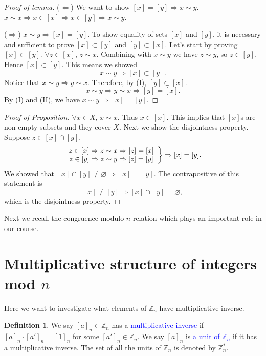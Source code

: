 \documentclass{article}
\theoremstyle{plain}
\theoremstyle{definition}
\newtheorem*{definition}{Definition}
\begin{document}
\begin{proof}[Proof of lemma]
    ($\Leftarrow$) We want to show $[x]=[y]\Rightarrow x\sim y$.
    $x\sim x\Rightarrow x\in[x]\Rightarrow x\in[y]\Rightarrow x\sim y$.

    ($\Rightarrow$) $x\sim y\Rightarrow[x]=[y]$.
    To show equality of sets $[x]$ and $[y]$, it is necessary
    and sufficient to prove $[x]\subset [y]$ and $[y]\subset [x]$.
    Let's start by proving $[x]\subset [y]$.
    $\forall z\in[x]$, $z\sim x$. Combining with $x\sim y$
    we have $z\sim y$, so $z\in[y]$. Hence $[x]\subset [y]$.
    This means we showed
    \begin{equation}
        x\sim y\Rightarrow [x]\subset [y].\tag{I}
    \end{equation}
    Notice that $x\sim y\Rightarrow y\sim x$. Therefore,
    by (I), $[y]\subset [x]$.
    \begin{equation}
        x\sim y\Rightarrow y\sim x\Rightarrow [y]=[x].\tag{II}
    \end{equation}
    By (I) and (II), we have $x\sim y\Rightarrow [x]=[y]$.
\end{proof}


\begin{proof}[Proof of Proposition]
    $\forall x\in X$, $x\sim x$. Thus $x\in[x]$.
    This implies that $[x]$s are non-empty subsets and they cover
    $X$. Next we show the disjointness property.
    Suppose $z\in[x]\cap[y]$.
    \[\left.\begin{array}[]{c}
        z\in[x]\Rightarrow z\sim x\Rightarrow [z]=[x]\\
        z\in[y]\Rightarrow z\sim y\Rightarrow [z]=[y]
    \end{array}\right\}\Rightarrow [x]=[y].\]
    We showed that $[x]\cap[y]\neq\varnothing\Rightarrow [x]=[y]$.
    The contrapositive of this statement is 
    \[[x]\neq [y]\Rightarrow[x]\cap[y]=\varnothing,\]
    which is the disjointness property.
\end{proof}


Next we recall the congruence modulo $n$ relation which 
plays an important role in our course.


\section{Multiplicative structure of integers mod $n$}
Here we want to investigate what elements of $\mathbb{Z}_n$
have multiplicative inverse.
\begin{definition}
    We say $[a]_n\in\mathbb{Z}_n$ has a \textcolor{blue}{multiplicative inverse}
    if $[a]_n\cdot [a']_n=[1]_n$ for some $[a']_n\in\mathbb{Z}_n$. We say $[a]_n$
    is \textcolor{blue}{a unit of $\mathbb{Z}_n$} if it has a multiplicative 
    inverse. The set of all the units of $\mathbb{Z}_n$ is denoted
    by $\mathbb{Z}_n^*$.
\end{definition}
\end{document}
